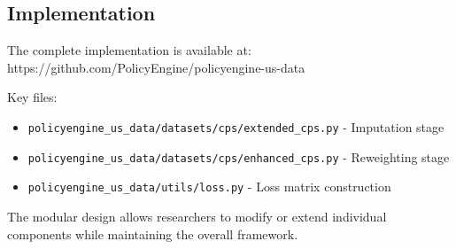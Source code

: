 \subsection{Implementation}

The complete implementation is available at:
https://github.com/PolicyEngine/policyengine-us-data

Key files:
\begin{itemize}
\item \texttt{policyengine\_us\_data/datasets/cps/extended\_cps.py} - Imputation stage
\item \texttt{policyengine\_us\_data/datasets/cps/enhanced\_cps.py} - Reweighting stage
\item \texttt{policyengine\_us\_data/utils/loss.py} - Loss matrix construction
\end{itemize}

The modular design allows researchers to modify or extend individual components while maintaining the overall framework.